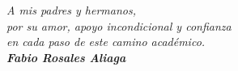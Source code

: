 
\vspace{4cm}

\begin{flushright}
    \textit{A mis padres y hermanos,}\\
    \textit{por su amor, apoyo incondicional y confianza}\\
    \textit{en cada paso de este camino académico.}\\[0.3cm]
    \textbf{\textit{Fabio Rosales Aliaga}}
\end{flushright}

